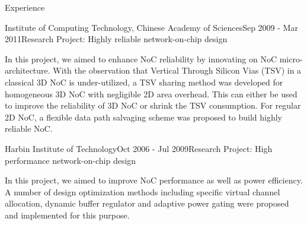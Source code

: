 \documentclass{resume} %
\begin{document}
\begin{rSection}{Experience}

\begin{rSubsection}{Institute of Computing Technology, Chinese Academy of Sciences}{Sep 2009 - Mar 2011}{Research Project: Highly reliable network-on-chip design}{}
\item In this project, we aimed to enhance NoC reliability by innovating on NoC micro-architecture. With
    the observation that Vertical Through Silicon Vias (TSV) in a classical 3D NoC is
    under-utilized, a TSV sharing method was developed for homogeneous 3D NoC with negligible 2D area
    overhead. This can either be used to improve the reliability of 3D NoC or shrink the TSV consumption.
    For regular 2D NoC, a flexible data path salvaging scheme was proposed to build highly reliable NoC.
\end{rSubsection}


\begin{rSubsection}{Harbin Institute of Technology}{Oct 2006 - Jul 2009}{Research Project: High performance network-on-chip design}{}
\item In this project, we aimed to improve NoC performance as well as power efficiency. A number of design
optimization methods including specific virtual channel allocation, dynamic buffer regulator and 
adaptive power gating were proposed and implemented for this purpose.
\end{rSubsection}

\end{rSection}
\end{document}

